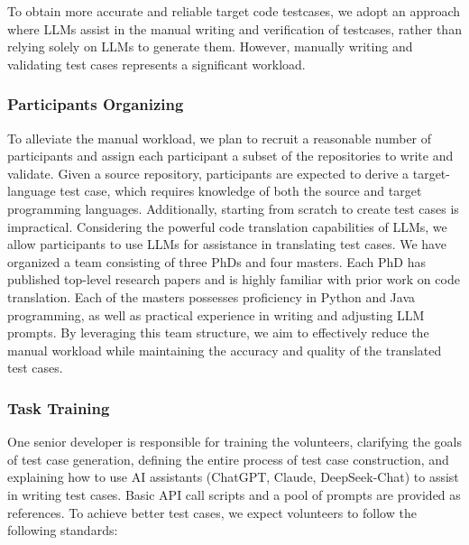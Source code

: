 To obtain more accurate and reliable target code testcases, we adopt an approach where LLMs assist in the manual writing and verification of testcases, rather than relying solely on LLMs to generate them. However, manually writing and validating test cases represents a significant workload.

\subsubsection{Participants Organizing}

To alleviate the manual workload, we plan to recruit a reasonable number of participants and assign each participant a subset of the repositories to write and validate. Given a source repository, participants are expected to derive a target-language test case, which requires knowledge of both the source and target programming languages. Additionally, starting from scratch to create test cases is impractical. Considering the powerful code translation capabilities of LLMs, we allow participants to use LLMs for assistance in translating test cases. We have organized a team consisting of three PhDs and four masters. Each PhD has published top-level research papers and is highly familiar with prior work on code translation. Each of the masters possesses proficiency in Python and Java programming, as well as practical experience in writing and adjusting LLM prompts. By leveraging this team structure, we aim to effectively reduce the manual workload while maintaining the accuracy and quality of the translated test cases.


\subsubsection{Task Training}
One senior developer is responsible for training the volunteers, clarifying the goals of test case generation, defining the entire process of test case construction, and explaining how to use AI assistants (ChatGPT, Claude, DeepSeek-Chat) to assist in writing test cases. Basic API call scripts and a pool of prompts are provided as references. To achieve better test cases, we expect volunteers to follow the following standards:

